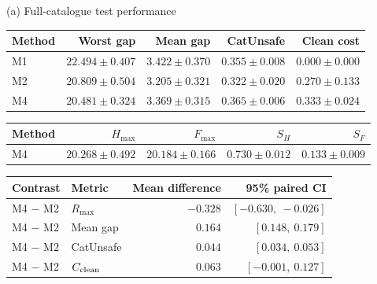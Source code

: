 {(a) Full-catalogue test performance}\par\smallskip
\begin{tabular}{@{}lrrrr@{}}
\toprule
Method & Worst gap & Mean gap & CatUnsafe & Clean cost \\
\midrule
M1 & $22.494 \pm 0.407$ & $3.422 \pm 0.370$ & $0.355 \pm 0.008$ & $0.000 \pm 0.000$ \\
M2 & $20.809 \pm 0.504$ & $3.205 \pm 0.321$ & $0.322 \pm 0.020$ & $0.270 \pm 0.133$ \\
M4 & $20.481 \pm 0.324$ & $3.369 \pm 0.315$ & $0.365 \pm 0.006$ & $0.333 \pm 0.024$ \\
\bottomrule
\end{tabular}

\par\smallskip
\begin{tabular}{@{}lrrrr@{}}\toprule
Method & $H_{\max}$ & $F_{\max}$ & $S_H$ & $S_F$\\\midrule
M4 & $20.268\pm0.492$ & $20.184\pm0.166$ & $0.730\pm0.012$ & $0.133\pm0.009$\\
\bottomrule\end{tabular}

\par\smallskip
\begin{tabular}{@{}llrr@{}}
\toprule
Contrast & Metric & Mean difference & 95\% paired CI \\
\midrule
M4 $-$ M2 & $R_{\max}$ & $-0.328$ & $[-0.630,\ -0.026]$ \\
M4 $-$ M2 & Mean gap & $0.164$ & $[0.148,\ 0.179]$ \\
M4 $-$ M2 & CatUnsafe & $0.044$ & $[0.034,\ 0.053]$ \\
M4 $-$ M2 & $C_{\rm clean}$ & $0.063$ & $[-0.001,\ 0.127]$ \\
\bottomrule
\end{tabular}
